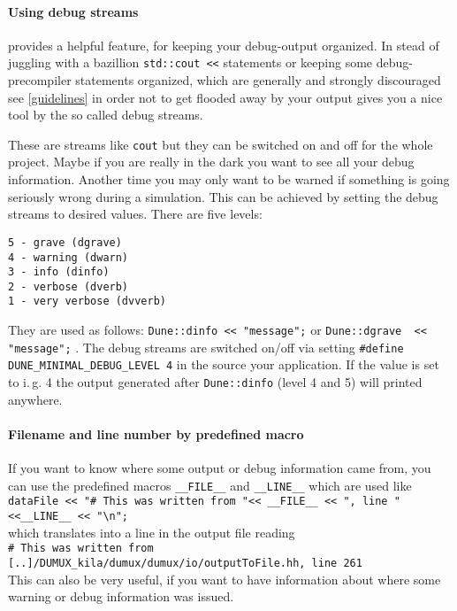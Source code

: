 \paragraph{Using \Dune debug streams}

\Dune provides a helpful feature, for keeping your debug-output organized. 
  In stead of juggling with a bazillion \texttt{std::cout <<} statements or keeping some debug-precompiler statements organized, which are generally and strongly discouraged see \ref{guidelines} in order not to get 
  flooded away by your output \Dune gives you a nice tool by the so called debug streams. 

  These are streams like \texttt{cout} but they can be switched on and off for the whole project. 
  Maybe if you are really in the  dark you want to see all your debug information. Another time you may only want to be warned if something is going seriously wrong during a simulation. 
  This can be achieved by setting the debug streams to desired values. There are five levels:
\begin{verbatim}
5 - grave (dgrave)
4 - warning (dwarn)
3 - info (dinfo)
2 - verbose (dverb)
1 - very verbose (dvverb)
\end{verbatim}

They are used as follows: \lstinline{Dune::dinfo << "message";} or \lstinline{Dune::dgrave  << "message";} .
The debug streams are switched on/off via  setting \lstinline{#define DUNE_MINIMAL_DEBUG_LEVEL 4}
in the source your application. If the value is set to i.\,g. 4 the output generated after \lstinline{Dune::dinfo} (level 4 and 5) will printed anywhere.

\paragraph{Filename and line number by predefined macro}

If you want to  know where some output or debug information came from, you can use the predefined macros \lstinline{__FILE__} and \lstinline{__LINE__}
which are used like\\
\lstinline{dataFile << "# This was written from "<< __FILE__ << ", line " <<__LINE__ << "\n";}\\
which translates into a line in the output file reading\\
\lstinline{# This was written from [..]/DUMUX_kila/dumux/dumux/io/outputToFile.hh, line 261}\\
This can also be very useful, if you want to have information about where some warning or debug information was issued. 

